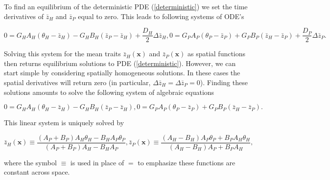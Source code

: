 \documentclass{article}
\begin{document}
To find an equilibrium of the deterministic PDE (\ref{deterministic}) we
set the time derivatives of \(\bar z_H\) and \(\bar z_P\) equal to zero.
This leads to following systems of ODE's

\begin{subequations}
  \begin{equation}
    0=G_HA_H(\theta_H-\bar z_H)-G_HB_H(\bar z_P-\bar z_H)+\frac{D_H}{2}\Delta\bar z_H,
  \end{equation}
  \begin{equation}
    0=G_PA_P(\theta_P-\bar z_P)+G_PB_P(\bar z_H-\bar z_P)+\frac{D_P}{2}\Delta\bar z_P.
  \end{equation}
\end{subequations}

Solving this system for the mean traits \(\bar z_H(\pmb x)\) and
\(\bar z_P(\pmb x)\) as spatial functions then returns equilibrium
solutions to PDE (\ref{deterministic}). However, we can start simple by
considering spatially homogeneous solutions. In these cases the spatial
derivatives will return zero (in particular,
\(\Delta\bar z_H=\Delta\bar z_P=0\)). Finding these solutions amounts to
solve the following system of algebraic equations

\begin{subequations}
  \begin{equation}
    0=G_HA_H(\theta_H-\bar z_H)-G_HB_H(\bar z_P-\bar z_H),
  \end{equation}
  \begin{equation}
    0=G_PA_P(\theta_P-\bar z_P)+G_PB_P(\bar z_H-\bar z_P).
  \end{equation}
\end{subequations}

This linear system is uniquely solved by

\begin{subequations}\label{non-spatial-eq}
  \begin{equation}
    \bar z_H(\pmb x)\equiv\frac{(A_P+B_P)A_H\theta_H-B_HA_P\theta_P}{(A_P+B_P)A_H-B_HA_P},
  \end{equation}
  \begin{equation}
    \bar z_P(\pmb x)\equiv\frac{(A_H-B_H)A_P\theta_P+B_PA_H\theta_H}{(A_H-B_H)A_P+B_PA_H},
  \end{equation}
\end{subequations}

where the symbol \(\equiv\) is used in place of \(=\) to emphasize these
functions are constant across space.
\end{document}
